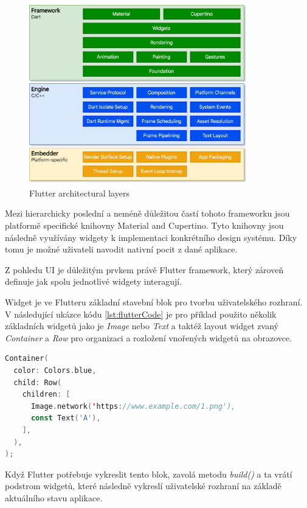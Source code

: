 \begin{figure}[H]
  \centering
  \includegraphics[width=0.85\textwidth]{flutter_architectural_layers.png}
  \caption{Flutter architectural layers}
  \label{fig:flutter_architectural_layers}
\end{figure}

Mezi hierarchicky poslední a neméně důležitou častí tohoto frameworku jsou platformě specifické knihovny Material and Cupertino. Tyto knihovny
jsou následně využívány widgety k implementaci konkrétního design systému. Díky tomu je možné uživateli navodit nativní pocit z dané aplikace.

\medskip

Z pohledu UI je důležitým prvkem právě Flutter framework, který zároveň definuje jak spolu jednotlivé widgety interagují.

Widget je ve Flutteru základní stavební blok pro tvorbu uživatelského rozhraní. \cite{flutterWidgets} V následující ukázce kódu \ref{lst:flutterCode} je pro příklad použito několik 
základních widgetů jako je \emph{Image} nebo \emph{Text} a taktéž layout widget zvaný \emph{Container} a \emph{Row} pro organizaci a 
rozložení vnořených widgetů na obrazovce.

\begin{lstlisting}[caption={Popis UI widgetů pomocí jazyka Dart}, label={lst:flutterCode}, language=Kotlin]
  Container(
  color: Colors.blue,
  child: Row(
    children: [
      Image.network('https://www.example.com/1.png'),
      const Text('A'),
    ],
  ),
);
\end{lstlisting}

Když Flutter potřebuje vykreslit tento blok, zavolá metodu \emph{build()} a ta vrátí podstrom widgetů, které následně vykreslí uživatelské 
rozhraní na základě aktuálního stavu aplikace. \cite*{flutterArchOverview}

